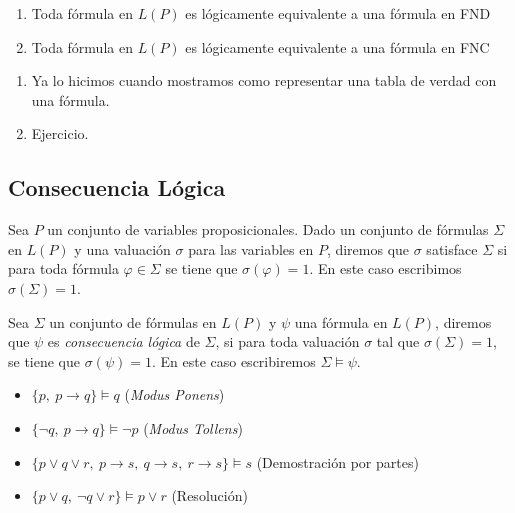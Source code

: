 \begin{teorema}
\begin{enumerate}
\item Toda f\'ormula en $L(P)$ es l\'ogicamente equivalente a una f\'ormula en FND
\item Toda f\'ormula en $L(P)$ es l\'ogicamente equivalente a una f\'ormula en FNC
\end{enumerate}
\end{teorema}

\begin{demostracion}
\begin{enumerate}
\item Ya lo hicimos cuando mostramos como representar una tabla de verdad con una f\'ormula.
\item Ejercicio. 
\end{enumerate}
\end{demostracion}

\subsection{Consecuencia L\'ogica}

Sea $P$ un conjunto de variables proposicionales.
Dado un conjunto de f\'ormulas $\Sigma$ en $L(P)$ y una valuaci\'on $\sigma$ para las variables en $P$,
diremos que $\sigma$ satisface $\Sigma$ si para toda f\'ormula $\varphi\in \Sigma$ se tiene que $\sigma(\varphi)=1$.
En este caso escribimos $\sigma(\Sigma)=1$.

\begin{definicion}
Sea $\Sigma$ un conjunto de f\'ormulas en $L(P)$ y $\psi$ una f\'ormula en $L(P)$, diremos que $\psi$ es
{\em consecuencia l\'ogica} de $\Sigma$, si para toda valuaci\'on $\sigma$ tal que $\sigma(\Sigma)=1$,
se tiene que $\sigma(\psi)=1$.
En este caso escribiremos $\Sigma \models \psi$.
\end{definicion} 

\begin{ejemplo}
\begin{itemize}
\item $\{p,\ p\to q\}\models q$ ({\em Modus Ponens})
\item $\{\neg q,\ p\to q\}\models \neg p$ ({\em Modus Tollens})
\item $\{p\vee q\vee r,\ p\to s,\ q\to s,\ r\to s\}\models s$ (Demostraci\'on por partes)
\item $\{p\vee q,\ \neg q\vee r\} \models p\vee r$ (Resoluci\'on)
\end{itemize}
\end{ejemplo}

